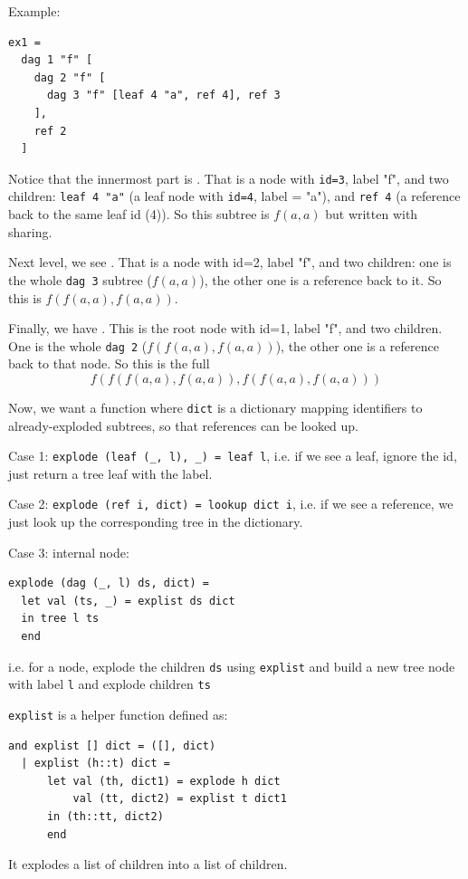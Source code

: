 Example:

\begin{verbatim}
ex1 = 
  dag 1 "f" [
    dag 2 "f" [
      dag 3 "f" [leaf 4 "a", ref 4], ref 3
    ],
    ref 2
  ]
\end{verbatim}

Notice that the innermost part is . That is a node with \texttt{id=3}, label "f", and two children: \texttt{leaf 4 "a"} (a leaf node with \texttt{id=4}, label = "a"), and \texttt{ref 4} (a reference back to the same leaf id (4)). So this subtree is $f(a,a)$ but written with sharing.

Next level, we see . That is a node with id=2, label "f", and two children: one is the whole \texttt{dag 3} subtree ($f(a,a)$), the other one is a reference back to it. So this is $f(f(a,a),f(a,a))$.

Finally, we have . This is the root node with id=1, label "f", and two children. One is the whole \texttt{dag 2} ($f(f(a,a),f(a,a))$), the other one is a reference back to that node. So this is the full
\[
f(f(f(a,a),f(a,a)),f(f(a,a),f(a,a)))
\]

Now, we want a function  where \texttt{dict} is a dictionary mapping identifiers to already-exploded subtrees, so that references can be looked up.

Case 1: \texttt{explode (leaf (\_, l), \_) = leaf l}, i.e. if we see a leaf, ignore the id, just return a tree leaf with the label.

Case 2: \texttt{explode (ref i, dict) = lookup dict i}, i.e. if we see a reference, we just look up the corresponding tree in the dictionary.

Case 3: internal  node:

\begin{verbatim}
explode (dag (_, l) ds, dict) = 
  let val (ts, _) = explist ds dict
  in tree l ts
  end
\end{verbatim}

i.e. for a node, explode the children \texttt{ds} using \texttt{explist} and build a new tree node with label \texttt{l} and explode children \texttt{ts}

\texttt{explist} is a helper function defined as:
\begin{verbatim}
and explist [] dict = ([], dict)
  | explist (h::t) dict =
      let val (th, dict1) = explode h dict
          val (tt, dict2) = explist t dict1
      in (th::tt, dict2)
      end
\end{verbatim}
It explodes a list of  children into a list of  children.

